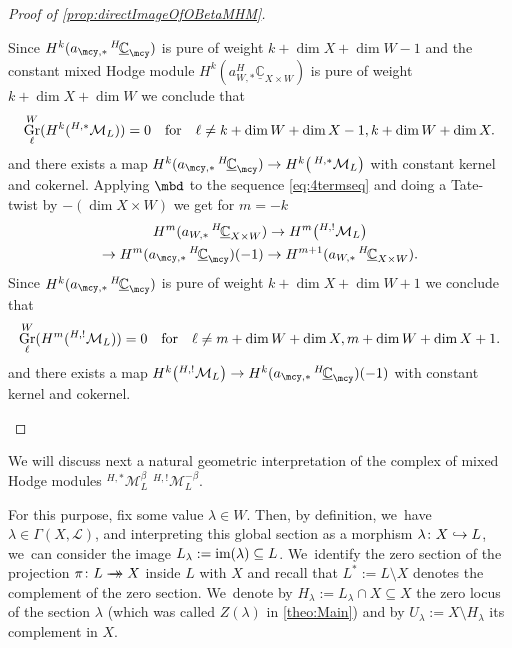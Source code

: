 \documentclass[JEP,XML,SOM,Unicode,published]{cedram}
\let\mathds\mathbb
\newcommand{\onto}{\mathchoice{\to\hspace*{-5mm}\to}{\to\hspace*{-2.85mm}\to}{\to\hspace*{-3mm}\to}{\to\hspace*{-3mm}\to}}
\newcommand\hto{\mathrel{\lhook\joinrel\to}}
\let\ra\rightarrow
\newcommand{\dC}{{\mathds C}}\let\C\dC
\newcommand{\Ell}{\mathscr{L}}
\newcommand{\cM}{\mathcal{M}}
\DeclareMathOperator{\gr}{\textup{Gr}}
\DeclareMathOperator{\im}{\textup{im}}
\newcommand{\Mh}{{^{H,*}}\cM_L^\beta}
\newcommand{\MhD}{{^{H,!}}\cM_L^{-\beta}}
\let\originalleft\left
\let\originalright\right
\renewcommand{\left}{\mathopen{}\mathclose\bgroup\originalleft}
\renewcommand{\right}{\aftergroup\egroup\originalright}
\begin{document}
\begin{proof}[Proof of \cref{prop:directImageOfOBetaMHM}]
\begin{enumerate}
Since $H^k(a_{\mcy,*}\, ^{H\!}\underline{\dC}_{\mcy})$ is pure of weight $k+ \dim X + \dim W -1$ and the constant mixed Hodge module $H^k(a_{W,*} ^{H\!}\underline{\dC}_{X \times W})$ is pure of weight $k +\dim X + \dim W$ we conclude that
\[
\gr^W_\ell (H^k({^{H,*}}\cM_L)) = 0 \quad \text{for} \quad \ell \neq k+ \dim W +\dim X -1,k+ \dim W +\dim X.
\]
and there exists a map $H^k(a_{\mcy,*} \, ^{H\!}\underline{\dC}_{\mcy}) \ra H^{k} \left({\,^{H,*}}\cM_L\right)$ with constant kernel and cokernel.
Applying $\mbd$ to the sequence \eqref{eq:4termseq} and doing a Tate-twist by $-(\dim X \times W)$ we get for $m = -k$
\begin{multline}
H^m(a_{W,*}\, ^{H\!}\underline{\dC}_{X \times W}) \to H^m\left({^{H,!}}\cM_L\right)\\
\to H^m(a_{\mcy,*} \, ^{H\!}\underline{\dC}_{\mcy})(-1) \to H^{m+1}(a_{W,*}\, ^{H\!}\underline{\dC}_{X \times W}).
\end{multline}
Since $H^k(a_{\mcy,*}\, ^{H\!}\underline{\dC}_{\mcy})$ is pure of weight $k+ \dim X + \dim W +1$ we conclude that
\[
\gr^W_\ell (H^m({^{H,!}}\cM_L)) = 0 \quad \text{for} \quad \ell \neq m+ \dim W +\dim X,m+ \dim W +\dim X+1.
\]
and there exists a map $ H^{k} \left({^{H,!}}\cM_L\right) \ra H^k(a_{\mcy,*} \, ^{H\!}\underline{\dC}_{\mcy})(-1)$ with constant kernel and cokernel.\qedhere
\end{enumerate}
\end{proof}

We will discuss next a natural geometric interpretation of the complex of mixed Hodge modules $\Mh$ \resp $\MhD$.

For this purpose, fix some value
$\lambda\in W$. Then, by definition, we~have $\lambda\in \Gamma(X, \Ell)$, and interpreting this global section as a morphism $\lambda \colon X \hto L$, we~can consider the image $L_\lambda:=\im(\lambda)\subseteq L$. We~identify the zero section of the projection $\pi\colon L\onto X$ inside $L$ with $X$ and recall that $L^{*}:=L\setminus X$ denotes the complement of the zero section. We~denote by $H_\lambda:=
L_\lambda \cap X \subseteq X$ the zero locus of the section $\lambda$ (which was called $Z(\lambda)$ in \cref{theo:Main}) and by $U_\lambda := X\setminus H_\lambda$
its complement in $X$.
\end{document}
